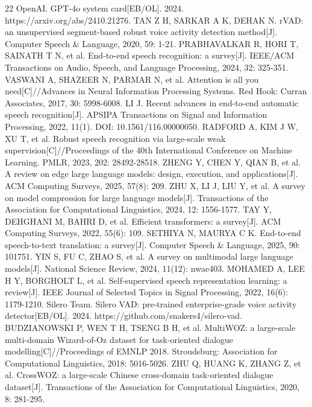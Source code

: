 \documentclass[UTF8,a4paper,zihao=5]{ctexart}
\begin{document}
\renewcommand{\refname}{参考文献}
\begin{thebibliography}{22}
 OpenAI. GPT-4o system card[EB/OL]. 2024. https://arxiv.org/abs/2410.21276.
 TAN Z H, SARKAR A K, DEHAK N. rVAD: an unsupervised segment-based robust voice activity detection method[J]. Computer Speech \& Language, 2020, 59: 1-21.
 PRABHAVALKAR R, HORI T, SAINATH T N, et al. End-to-end speech recognition: a survey[J]. IEEE/ACM Transactions on Audio, Speech, and Language Processing, 2024, 32: 325-351.
 VASWANI A, SHAZEER N, PARMAR N, et al. Attention is all you need[C]//Advances in Neural Information Processing Systems. Red Hook: Curran Associates, 2017, 30: 5998-6008.
 LI J. Recent advances in end-to-end automatic speech recognition[J]. APSIPA Transactions on Signal and Information Processing, 2022, 11(1). DOI: 10.1561/116.00000050.
 RADFORD A, KIM J W, XU T, et al. Robust speech recognition via large-scale weak supervision[C]//Proceedings of the 40th International Conference on Machine Learning. PMLR, 2023, 202: 28492-28518.
 ZHENG Y, CHEN Y, QIAN B, et al. A review on edge large language models: design, execution, and applications[J]. ACM Computing Surveys, 2025, 57(8): 209.
 ZHU X, LI J, LIU Y, et al. A survey on model compression for large language models[J]. Transactions of the Association for Computational Linguistics, 2024, 12: 1556-1577.
 TAY Y, DEHGHANI M, BAHRI D, et al. Efficient transformers: a survey[J]. ACM Computing Surveys, 2022, 55(6): 109.
 SETHIYA N, MAURYA C K. End-to-end speech-to-text translation: a survey[J]. Computer Speech \& Language, 2025, 90: 101751.
 YIN S, FU C, ZHAO S, et al. A survey on multimodal large language models[J]. National Science Review, 2024, 11(12): nwae403.
 MOHAMED A, LEE H Y, BORGHOLT L, et al. Self-supervised speech representation learning: a review[J]. IEEE Journal of Selected Topics in Signal Processing, 2022, 16(6): 1179-1210.
 Silero Team. Silero VAD: pre-trained enterprise-grade voice activity detector[EB/OL]. 2024. https://github.com/snakers4/silero-vad.
 BUDZIANOWSKI P, WEN T H, TSENG B H, et al. MultiWOZ: a large-scale multi-domain Wizard-of-Oz dataset for task-oriented dialogue modelling[C]//Proceedings of EMNLP 2018. Stroudsburg: Association for Computational Linguistics, 2018: 5016-5026.
 ZHU Q, HUANG K, ZHANG Z, et al. CrossWOZ: a large-scale Chinese cross-domain task-oriented dialogue dataset[J]. Transactions of the Association for Computational Linguistics, 2020, 8: 281-295.

\end{thebibliography}
\end{document}
